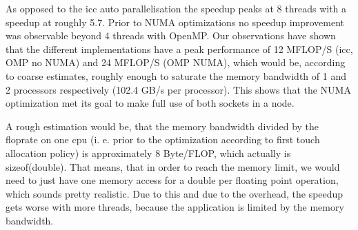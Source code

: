 As opposed to the icc auto parallelisation the speedup peaks at 8 threads with a speedup at roughly 5.7. Prior to NUMA optimizations no speedup improvement was observable beyond 4 threads with OpenMP. Our observations have shown that the different implementations have a peak performance of 12 MFLOP/S (icc, OMP no NUMA) and 24 MFLOP/S (OMP NUMA), which would be, according to coarse estimates, roughly enough to saturate the memory bandwidth of 1 and 2 processors respectively (102.4 GB/s per processor). This shows that the NUMA optimization met its goal to make full use of both sockets in a node. 

A rough estimation would be, that the memory bandwidth divided by the floprate on one cpu (i. e. prior to the optimization according to first touch allocation policy) is approximately 8 Byte/FLOP, which actually is sizeof(double). That means, that in order to reach the memory limit, we would need to just have one memory access for a double per floating point operation, which sounds pretty realistic. Due to this and due to the overhead, the speedup gets worse with more threads, because the application is limited by the memory bandwidth.
